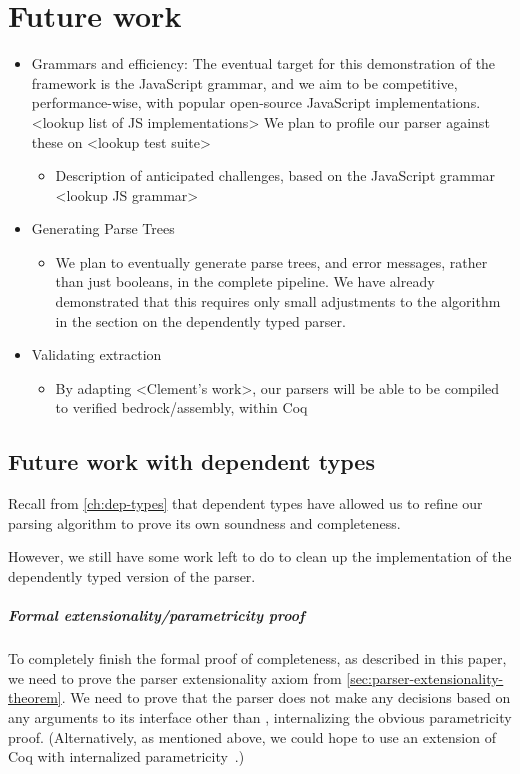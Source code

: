 \chapter{Future work}
  \begin{itemize} \item  Grammars and efficiency: The eventual target for this demonstration of the framework is the JavaScript grammar, and we aim to be competitive, performance-wise, with popular open-source JavaScript implementations. <lookup list of JS implementations>  We plan to profile our parser against these on <lookup test suite>
    \begin{itemize} \item  Description of anticipated challenges, based on the JavaScript grammar <lookup JS grammar> \end{itemize}
  \item  Generating Parse Trees
    \begin{itemize} \item  We plan to eventually generate parse trees, and error messages, rather than just booleans, in the complete pipeline.  We have already demonstrated that this requires only small adjustments to the algorithm in the section on the dependently typed parser. \end{itemize}
  \item  Validating extraction
    \begin{itemize} \item  By adapting <Clement's work>, our parsers will be able to be compiled to verified bedrock/assembly, within Coq \end{itemize}
    \end{itemize}
\section{Future work with dependent types}
  Recall from \autoref{ch:dep-types} that dependent types have allowed us to refine our parsing algorithm to prove its own soundness and completeness.
  
  However, we still have some work left to do to clean up the implementation of the dependently typed version of the parser.
  
  \paragraph{Formal extensionality/parametricity proof}
    To completely finish the formal proof of completeness, as described in this paper, we need to prove the parser extensionality axiom from \autoref{sec:parser-extensionality-theorem}.  We need to prove that the parser does not make any decisions based on any arguments to its interface other than , internalizing the obvious parametricity proof.  (Alternatively, as mentioned above, we could hope to use an extension of Coq with internalized parametricity~\cite{InColor}.)

